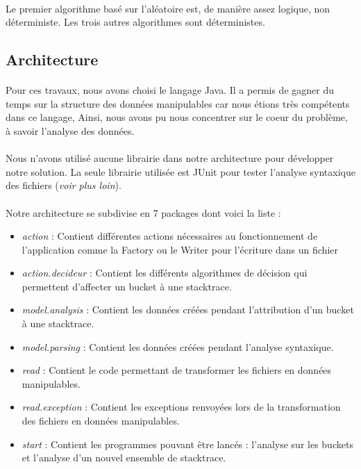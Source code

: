 \documentclass{article}
\begin{document}
\paragraph{}
Le premier algorithme basé sur l'aléatoire est, de manière assez logique, non déterministe. Les trois autres algorithmes sont déterministes.

\subsection{Architecture}

\paragraph{}
Pour ces travaux, nous avons choisi le langage Java. Il a permis de gagner du temps sur la structure des données manipulables car nous étions très compétents dans ce langage, Ainsi, nous avons pu nous concentrer sur le coeur du problème, à savoir l'analyse des données.

\paragraph{}
Nous n'avons utilisé aucune librairie dans notre architecture pour développer notre solution. La seule librairie utilisée est JUnit pour tester l'analyse syntaxique des fichiers (\textit{voir plus loin}).

\paragraph{}
Notre architecture se subdivise en 7 packages dont voici la liste :

\begin{itemize}
\item \textit{action} : Contient différentes actions nécessaires au fonctionnement de l'application comme la Factory ou le Writer pour l'écriture dans un fichier
\item \textit{action.decideur} : Contient les différents algorithmes de décision qui permettent d'affecter un bucket à une stacktrace.
\item \textit{model.analysis} : Contient les données créées pendant l'attribution d'un bucket à une stacktrace.
\item \textit{model.parsing} : Contient les données créées pendant l'analyse syntaxique.
\item \textit{read} : Contient le code permettant de transformer les fichiers en données manipulables.
\item \textit{read.exception} : Contient les exceptions renvoyées lors de la transformation des fichiers en données manipulables.
\item \textit{start} : Contient les programmes pouvant être lancés : l'analyse sur les buckets et l'analyse d'un nouvel ensemble de stacktrace.
\end{itemize}
\end{document}
